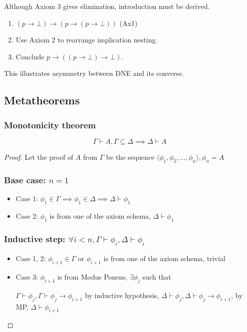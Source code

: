 \documentclass{article}
\newtheorem{theorem}{Theorem}[section]
\let\oldtheorem\theorem
\let\endoldtheorem\endtheorem
\renewenvironment{theorem}
  {\begin{tcolorbox}[
      colback=yellow!6,
      colframe=yellow!60!black,
      boxrule=0.6pt,
      arc=2pt,
      left=6pt,right=6pt,top=4pt,bottom=4pt,
      parbox=false
    ]\oldtheorem}
  {\endoldtheorem\end{tcolorbox}}
\begin{document}
Although Axiom 3 gives elimination,
introduction must be derived.

\begin{enumerate}
    \item $(p \to \bot) \to (p \to (p \to \bot))$ \hfill (Ax1)
    \item Use Axiom 2 to rearrange implication nesting.
    \item Conclude $p \to ((p \to \bot) \to \bot)$.
\end{enumerate}

This illustrates asymmetry between DNE and its converse.

\subsection{Metatheorems}
\subsubsection{Monotonicity theorem}
\begin{theorem}
\[\Gamma \vdash A, \Gamma \subseteq \Delta \implies \Delta \vdash A\]    
\end{theorem}
\begin{proof}
    Let the proof of $A$ from $\Gamma$ be the sequence $\langle \phi_1, \phi_2, \dots, \phi_n\rangle, \phi_n = A$
    \subsubsection*{Base case: $n = 1$}
    \begin{itemize}
        \item Case 1: $\phi_1 \in \Gamma \implies \phi_1 \in \Delta \implies \Delta \vdash \phi_1$
        \item Case 2: $\phi_1$ is from one of the axiom schema, $\Delta \vdash \phi_1$
    \end{itemize}
    \subsubsection*{Inductive step: $\forall i < n, \Gamma \vdash \phi_i, \Delta \vdash \phi_i$}
    \begin{itemize}
        \item Case 1, 2: $\phi_{i+1} \in \Gamma$ or $\phi_{i+1}$ is from one of the axiom schema, trivial
        \item Case 3: $\phi_{i+1}$ is from Modus Ponens, $\exists \phi_j$ such that 
        \begin{prooftree}
        \end{prooftree}
        $\Gamma \vdash \phi_j, \Gamma \vdash \phi_j \rightarrow \phi_{i+1}$ by inductive hypothesis, $\Delta \vdash \phi_j, \Delta \vdash \phi_j \rightarrow \phi_{i+1}$, by MP, $\Delta \vdash \phi_{i+1}$
    \end{itemize}
\end{proof}
\end{document}
